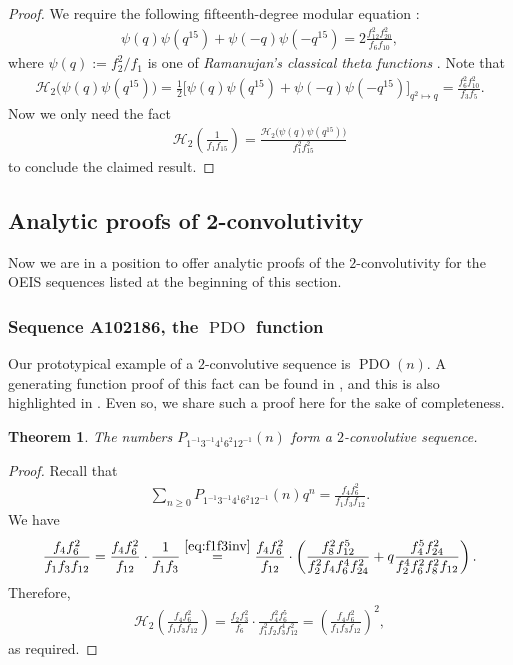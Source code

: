 \documentclass[12pt,reqno]{amsart}
\numberwithin{equation}{section}
\theoremstyle{plain}
\newtheorem{theorem}{Theorem}[section]
\theoremstyle{definition}
\theoremstyle{named}
\newcommand{\HH}{\mathcal{H}}
\newcommand{\PDO}{\operatorname{PDO}}
\begin{document}
\begin{proof}
	We require the following fifteenth-degree modular equation \cite[p.~377, Entry~9(iv)]{Ber91}:
	\begin{align*}
		\psi(q)\psi(q^{15}) + \psi(-q)\psi(-q^{15}) = 2\frac{f_{12}^2f_{20}^2}{f_6f_{10}},
	\end{align*}
	where $\psi(q):= f_2^2/f_1$ is one of \emph{Ramanujan's classical theta functions} \cite[p.~36, Entry~22(ii)]{Ber91}. Note that
	\begin{align*}
		\HH_2\big(\psi(q)\psi(q^{15})\big) = \frac{1}{2}\big[\psi(q)\psi(q^{15}) + \psi(-q)\psi(-q^{15})\big]_{q^2\mapsto q} = \frac{f_{6}^2f_{10}^2}{f_3f_{5}}.
	\end{align*}
	Now we only need the fact
	\begin{align*}
		\HH_2\left(\frac{1}{f_1 f_{15}}\right) = \frac{\HH_2\big(\psi(q)\psi(q^{15})\big)}{f_1^2 f_{15}^2}
	\end{align*}
	to conclude the claimed result.
\end{proof}

\subsection{Analytic proofs of 2-convolutivity}

Now we are in a position to offer analytic proofs of the $2$-convolutivity for the OEIS sequences listed at the beginning of this section.

\subsubsection{Sequence A102186, the $\PDO$ function}

Our prototypical example of a $2$-convolutive sequence is  $\PDO(n)$.  A generating function proof of this fact can be found in \cite{ALL2002}, and this is also highlighted in \cite{Sel2024_INTEGERS}.  Even so, we share such a proof here for the sake of completeness.

\begin{theorem}\label{th:A102186}
	The numbers $P_{1^{-1}3^{-1}4^{1}6^{2}12^{-1}}(n)$ form a $2$-convolutive sequence.
\end{theorem}

\begin{proof}
	Recall that
	\begin{align*}
		\sum_{n\ge 0} P_{1^{-1}3^{-1}4^{1}6^{2}12^{-1}}(n) q^n = \frac{f_4 f_6^2}{f_1 f_3 f_{12}}.
	\end{align*}
	We have
	\begin{align*}
		\frac{f_4 f_6^2}{f_1 f_3 f_{12}} = \frac{f_4 f_6^2}{f_{12}}\cdot \frac{1}{f_1 f_3} \overset{\eqref{eq:f1f3inv}}{=} \frac{f_4 f_6^2}{f_{12}}\cdot \left(\frac{f_8^2f_{12}^5}{f_2^2f_4f_6^4f_{24}^2}+q\frac{f_4^5f_{24}^2}{f_2^4f_6^2f_8^2f_{12}}\right).
	\end{align*}
	Therefore,
	\begin{align*}
		\HH_2\left(\frac{f_4 f_6^2}{f_1 f_3 f_{12}}\right) = \frac{f_2 f_3^2}{f_{6}}\cdot \frac{f_4^2f_{6}^5}{f_1^2f_2f_3^4f_{12}^2} = \left(\frac{f_4 f_6^2}{f_1 f_3 f_{12}}\right)^2,
	\end{align*}
	as required.
\end{proof}
\end{document}
